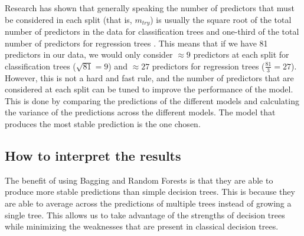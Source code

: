 Research has shown that generally speaking the number of predictors that must be considered in each split (that is, $m_{try}$) is usually the square root of the total number of predictors in the data for classification trees and one-third of the total number of predictors for regression trees \citep{breimanRandomForests2001,sandriBiasCorrectionAlgorithm2008,hastieElementsStatisticalLearning2009,
janitzaOverestimationRandomForests2018,boehmkeHandsOnMachineLearning2019,jamesIntroductionStatisticalLearning2021}. This means that if we have 81 predictors in our data, we would only consider $\approx 9$ predictors at each split for classification trees ($\sqrt{81} = 9$) and $\approx 27$ predictors for regression trees ($\frac{81}{3} = 27$). However, this is not a hard and fast rule, and the number of predictors that are considered at each split can be tuned to improve the performance of the model. This is done by comparing the predictions of the different models and calculating the variance of the predictions across the different models. The model that produces the most stable prediction is the one chosen.

\subsection{How to interpret the results} \label{sec:random_forests_interpret}

The benefit of using Bagging and Random Forests is that they are able to produce more stable predictions than simple decision trees. This is because they are able to average across the predictions of multiple trees instead of growing a single tree. This allows us to take advantage of the strengths of decision trees while minimizing the weaknesses that are present in classical decision trees. 

